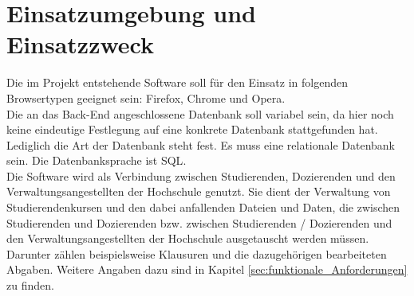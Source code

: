 
\chapter{Einsatzumgebung und Einsatzzweck}
Die im Projekt entstehende Software soll für den Einsatz in folgenden Browsertypen geeignet sein: Firefox, Chrome und Opera. \\
Die an das \gls{Back-End} angeschlossene Datenbank soll variabel sein, da hier noch keine eindeutige Festlegung auf eine konkrete Datenbank stattgefunden hat. Lediglich die Art der Datenbank steht fest. Es muss eine \gls{relationale Datenbank} sein. Die Datenbanksprache ist \gls{SQL}.\\

Die Software wird als Verbindung zwischen \gls{Studierende}n, \gls{Dozierende}n und den \gls{Verwaltungsangestellte}n der Hochschule genutzt. Sie dient der Verwaltung von \gls{Studierendenkurs}en und den dabei anfallenden Dateien und Daten, die zwischen \gls{Studierende}n und \gls{Dozierende}n bzw. zwischen \gls{Studierende}n / \gls{Dozierende}n und den \gls{Verwaltungsangestellte}n der Hochschule ausgetauscht werden müssen. \\
Darunter zählen beispielsweise Klausuren und die dazugehörigen bearbeiteten Abgaben. Weitere Angaben dazu sind in Kapitel \ref{sec:funktionale_Anforderungen} zu finden. 
